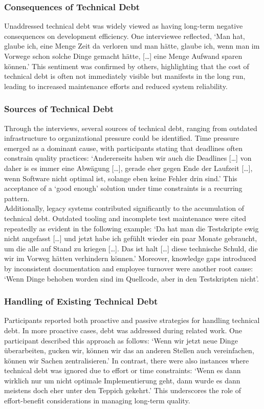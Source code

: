 \subsubsection{Consequences of Technical Debt}
Unaddressed technical debt was widely viewed as having long-term negative consequences on development efficiency. One interviewee reflected, `Man hat, glaube ich, eine Menge Zeit da verloren und man hätte, glaube ich, wenn man im Vorwege schon solche Dinge gemacht hätte, [\ldots] eine Menge Aufwand sparen können.'
This sentiment was confirmed by others, highlighting that the cost of technical debt is often not immediately visible but manifests in the long run, leading to increased maintenance efforts and reduced system reliability.\\

\subsubsection{Sources of Technical Debt}
Through the interviews, several sources of technical debt, ranging from outdated infrastructure to organizational pressure could be identified. Time pressure emerged as a dominant cause, with participants stating that deadlines often constrain quality practices: `Andererseits haben wir auch die Deadlines [\ldots] von daher is es immer eine Abwägung
[\ldots], gerade eher gegen Ende der Laufzeit [\ldots], wenn Software nicht optimal ist, solange eben keine Fehler drin sind.' This acceptance of a `good enough' solution under time constraints is a recurring pattern.\\

Additionally, legacy systems contributed significantly to the accumulation of technical debt. Outdated tooling and incomplete test maintenance were cited repeatedly as evident in the following example: `Da hat man die Testskripte ewig nicht angefasst [\ldots] und jetzt habe ich gefühlt wieder ein paar Monate gebraucht, um die alle auf Stand zu kriegen [\ldots].
Das ist halt [\ldots] diese technische Schuld, die wir im Vorweg hätten verhindern können.' Moreover, knowledge gaps introduced by inconsistent documentation and employee turnover were another root cause: `Wenn Dinge behoben worden sind im Quellcode, aber in den Testskripten nicht'.

\subsubsection{Handling of Existing Technical Debt}
Participants reported both proactive and passive strategies for handling technical debt. In more proactive cases, debt was addressed during related work. One participant described this approach as follows: `Wenn wir jetzt neue Dinge überarbeiten, gucken wir, können wir das an anderen Stellen auch vereinfachen, können wir Sachen zentralisieren.'
In contrast, there were also instances where technical debt was ignored due to effort or time constraints: `Wenn es dann wirklich nur um nicht optimale Implementierung geht, dann wurde es dann meistens doch eher unter den Teppich gekehrt.'
This underscores the role of effort-benefit considerations in managing long-term quality.\\

